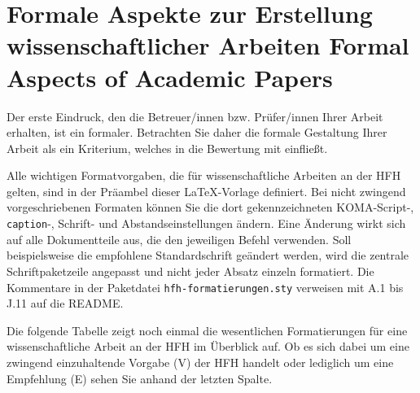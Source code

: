 \chapter{\DEEN
  {Formale Aspekte zur Erstellung wissenschaftlicher Arbeiten}
  {Formal Aspects of Academic Papers}}

Der erste Eindruck, den die Betreuer/innen bzw. Prüfer/innen Ihrer Arbeit
erhalten, ist ein formaler. Betrachten Sie daher die formale Gestaltung Ihrer
Arbeit als ein Kriterium, welches in die Bewertung mit einfließt.

Alle wichtigen Formatvorgaben, die für wissenschaftliche Arbeiten an der HFH
gelten, sind in der Präambel dieser LaTeX-Vorlage definiert. Bei nicht
zwingend vorgeschriebenen Formaten können Sie die dort gekennzeichneten
KOMA-Script-, \texttt{caption}-, Schrift- und Abstandseinstellungen ändern.
Eine Änderung wirkt sich auf alle Dokumentteile aus, die den jeweiligen
Befehl verwenden. Soll beispielsweise die empfohlene Standardschrift
geändert werden, wird die zentrale Schriftpaketzeile angepasst und nicht
jeder Absatz einzeln formatiert. Die Kommentare in der Paketdatei
\texttt{hfh-formatierungen.sty} verweisen mit A.1 bis J.11 auf die README.

Die folgende Tabelle zeigt noch einmal die wesentlichen Formatierungen für
eine wissenschaftliche Arbeit an der HFH im Überblick auf. Ob es sich dabei
um eine zwingend einzuhaltende Vorgabe (V) der HFH handelt oder lediglich um
eine Empfehlung (E) sehen Sie anhand der letzten Spalte.

